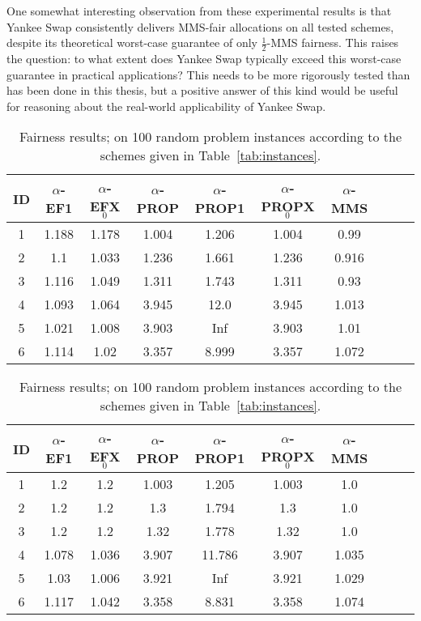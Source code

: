 One somewhat interesting observation from these experimental results is that Yankee Swap consistently delivers MMS-fair allocations on all tested schemes, despite its theoretical worst-case guarantee of only $\frac{1}{2}$-MMS fairness. This raises the question: to what extent does Yankee Swap typically exceed this worst-case guarantee in practical applications? This needs to be more rigorously tested than has been done in this thesis, but a positive answer of this kind would be useful for reasoning about the real-world applicability of Yankee Swap. 


\begin{table}[ht!]
  \centering
    \begin{tabular}{cccccccccc}
\toprule
ID & $\alpha$-EF1 & $\alpha$-EFX$_0$ & $\alpha$-PROP & $\alpha$-PROP1 & $\alpha$-PROPX$_0$ & $\alpha$-MMS \\
\midrule
1 & 1.188 &  1.178 & 1.004 & 1.206 & 1.004 & 0.99 \\
2 & 1.1   &  1.033 & 1.236 & 1.661 & 1.236 & 0.916 \\
3 & 1.116 &  1.049 & 1.311 & 1.743 & 1.311 & 0.93 \\
4 & 1.093 &  1.064 & 3.945 & 12.0  & 3.945 & 1.013 \\
5 & 1.021 &  1.008 & 3.903 & Inf & 3.903 & 1.01 \\
6 & 1.114 & 1.02 & 3.357 & 8.999 & 3.357 & 1.072 \\
\bottomrule
    \end{tabular}
  \caption{Fairness results;  on 100 random problem instances according to the schemes given in Table~\ref{tab:instances}.}
  \label{res:eit}
\end{table}

\begin{table}
  \centering
    \begin{tabular}{cccccccccc}
\toprule
ID & $\alpha$-EF1 & $\alpha$-EFX$_0$ & $\alpha$-PROP & $\alpha$-PROP1 & $\alpha$-PROPX$_0$ & $\alpha$-MMS \\
\midrule
1 & 1.2      & 1.2   & 1.003 & 1.205  & 1.003 & 1.0\\
2 & 1.2      & 1.2   & 1.3   & 1.794  & 1.3   & 1.0\\
3 & 1.2      & 1.2   & 1.32  & 1.778  & 1.32  & 1.0\\
4  & 1.078    & 1.036 & 3.907 & 11.786 & 3.907 & 1.035\\
5  & 1.03     & 1.006 & 3.921 & Inf    & 3.921 & 1.029\\
6  & 1.117    & 1.042 & 3.358 & 8.831  & 3.358 & 1.074\\
\bottomrule
    \end{tabular}
  \caption{Fairness results;  on 100 random problem instances according to the schemes given in Table~\ref{tab:instances}.}
  \label{res:algmms}
\end{table}

